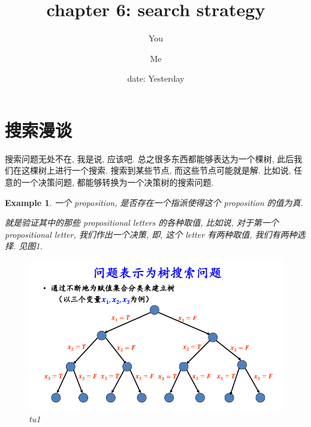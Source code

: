 \documentclass[a4paper, 10pt]{ctexart} %
\title{chapter 6: search strategy}
\author{You \and Me}
\date{date: Yesterday}
\newtheorem{example}{Example}
\begin{document}
\maketitle  
\tableofcontents
\newpage

\section{搜索漫谈}
搜索问题无处不在, 我是说, 应该吧. 
总之很多东西都能够表达为一个棵树, 此后我们在这棵树上进行一个搜索.
搜索到某些节点, 而这些节点可能就是解. 比如说, 任意的一个决策问题, 
都能够转换为一个决策树的搜索问题. 

\begin{example}
    一个 proposition, 是否存在一个指派使得这个 proposition 
    的值为真.

    就是验证其中的那些 propositional letters 的各种取值, 比如说, 对于第一个 propositional letter, 
    我们作出一个决策, 即, 这个 letter 有两种取值, 我们有两种选择. 见图1.
    \begin{figure}
        \centering
        \includegraphics[scale = 0.5]{ss0.png}
        \caption{tu1}
    \end{figure}
\end{example}
\end{document}
